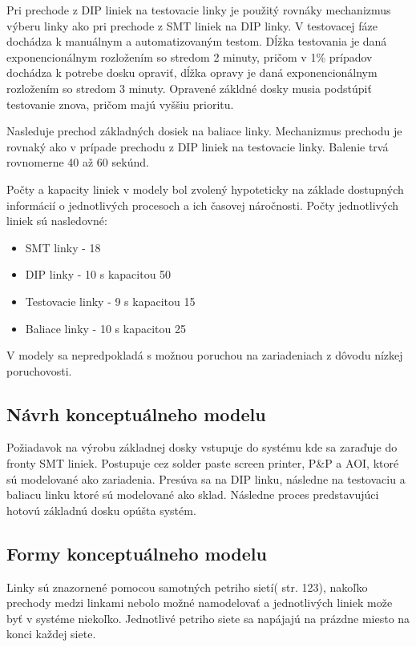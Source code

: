 \documentclass[12pt,a4paper,titlepage,final]{article}
\begin{document}
Pri prechode z DIP liniek na testovacie linky je použitý rovnáky mechanizmus
výberu linky ako pri prechode z SMT liniek na DIP linky. V testovacej fáze 
dochádza k manuálnym a automatizovaným testom. Dĺžka testovania je daná 
exponencionálnym rozložením so stredom 2 minuty, pričom v 1\% prípadov dochádza
k potrebe dosku opraviť, dĺžka opravy je daná exponencionálnym rozložením so
stredom 3 minuty. Opravené zákldné dosky musia podstúpiť testovanie znova, pričom
majú vyššiu prioritu.

Nasleduje prechod základných dosiek na baliace linky. Mechanizmus prechodu je
rovnaký ako v prípade prechodu z DIP liniek na testovacie linky. Balenie trvá 
rovnomerne 40 až 60 sekúnd.

Počty a kapacity liniek v modely bol zvolený hypoteticky na základe dostupných informácií
o jednotlivých procesoch a ich časovej náročnosti. Počty jednotlivých liniek sú
nasledovné:
\begin{itemize}
 \item SMT linky - 18
 \item DIP linky - 10 s kapacitou 50
 \item Testovacie linky - 9 s kapacitou 15
 \item Baliace linky - 10 s kapacitou 25
\end{itemize}

V modely sa nepredpokladá s možnou poruchou na zariadeniach z dôvodu nízkej
poruchovosti.

\subsection{Návrh konceptuálneho modelu}
Požiadavok na výrobu základnej dosky vstupuje do systému kde sa zaraďuje do fronty
SMT liniek. Postupuje cez solder paste screen printer, P\&P a AOI, ktoré 
sú modelované ako zariadenia. Presúva sa na DIP linku, následne na testovaciu
a baliacu linku ktoré sú modelované ako sklad. Následne proces predstavujúci
hotovú základnú dosku opúšta systém.

\subsection{Formy konceptuálneho modelu}
Linky sú znazornené pomocou samotných petriho sietí(\cite{peringer-slidy} str. 123),
nakoľko prechody medzi linkami nebolo možné namodelovať a jednotlivých liniek 
može byť v systéme niekoľko. Jednotlivé petriho siete sa napájajú na prázdne
miesto na konci každej siete. 
\end{document}
